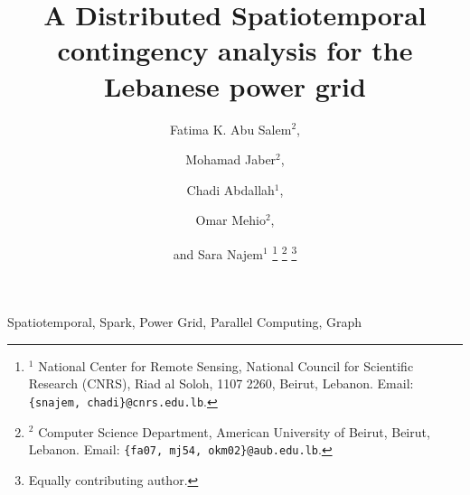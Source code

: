 \documentclass[journal]{IEEEtran}
\begin{document}
\title{A Distributed Spatiotemporal contingency analysis for the Lebanese power grid}


\author{Fatima K. Abu Salem$^{2}$, \and
Mohamad  Jaber$^{2}$, \and 
Chadi Abdallah$^{1}$, \and 
Omar Mehio$^{2}$, \and and Sara Najem$^{1}$
\thanks{$^1$ National Center for Remote Sensing, National Council for Scientific Research (CNRS), Riad al Soloh, 1107 2260, Beirut, Lebanon. Email: \texttt{\{snajem, chadi\}@cnrs.edu.lb}.}
\thanks{$^2$ Computer Science Department, American University of Beirut, Beirut, Lebanon. Email: \texttt{\{fa07, mj54, okm02\}@aub.edu.lb}.}
\thanks{Equally contributing author.}
}





%
{}


\maketitle


\begin{IEEEkeywords}
Spatiotemporal, Spark, Power Grid, Parallel Computing, Graph
\end{IEEEkeywords}


\IEEEpeerreviewmaketitle

\maketitle









\end{document}
